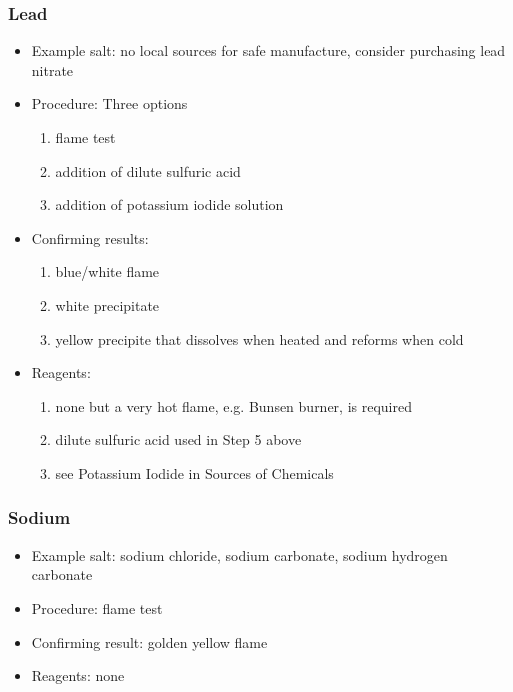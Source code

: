 \subsubsection{Lead}
\begin{itemize}
\item{Example salt: no local sources for safe manufacture, 
consider purchasing lead nitrate}

\item{Procedure: Three options
\begin{enumerate}
\item{flame test} 
\item{addition of dilute sulfuric acid}
\item{addition of potassium iodide solution}
\end{enumerate}
} %

\item{Confirming results:
\begin{enumerate}
\item{blue/white flame}
\item{white precipitate}
\item{yellow precipite that dissolves when heated and reforms when cold}
\end{enumerate}
} %

\item{Reagents:
\begin{enumerate}
\item{none but a very hot flame, e.g. Bunsen burner, is required} 
\item{dilute sulfuric acid used in Step 5 above}
\item{see Potassium Iodide in Sources of Chemicals}
\end{enumerate}
} %

\end{itemize} %

\subsubsection{Sodium}
\begin{itemize}
\item{Example salt: sodium chloride, 
sodium carbonate, 
sodium hydrogen carbonate}
\item{Procedure: flame test}
\item{Confirming result: golden yellow flame}
\item{Reagents: none}
\end{itemize}

